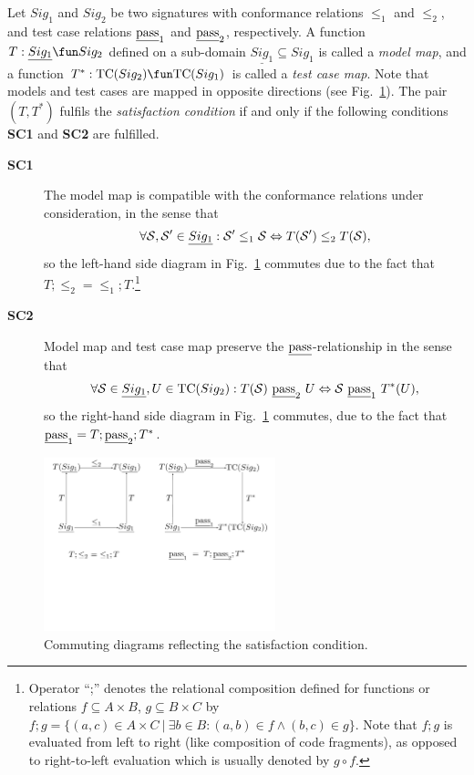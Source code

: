 Let $Sig_1$ and $Sig_2$ be two signatures with conformance relations $\le_1$ and $\le_2$,
and test case relations $\underline{\text{pass}}_1$ and $\underline{\text{pass}}_2$, respectively.
A function $T:\underline{Sig_1} \fun Sig_2$ defined on a sub-domain $\underline{Sig_1} \subseteq Sig_1$
 is called
a \emph{model map}, and a function $T^*:\tc(Sig_2) \fun \tc(Sig_1)$ is called a \emph{test case map}. Note that models and test cases are mapped in opposite directions
(see Fig.~\ref{fig:satisfaction-relation}).
The pair $(T,T^*)$ fulfils the \emph{satisfaction condition} if and only if the following conditions {\bf SC1} and {\bf SC2} are fulfilled.
\begin{description}
\item[\bf SC1] The model map is compatible with the conformance relations under consideration, in the sense that
$$
\forall {\cal S},{\cal S}'\in \underline{Sig_1}: {\cal S}' \le_1 {\cal S} \Leftrightarrow
T({\cal S}') \le_2 T({\cal S}),
$$
so   the left-hand side diagram   in Fig.~\ref{fig:satisfaction-relation} commutes due to the fact that
$T;\le_2 = \le_1;T$.\footnote{Operator ``;'' denotes the relational composition defined for
functions or relations $f\subseteq A\times B$, $g\subseteq B\times C$ by
$f;g = \{(a,c)\in A\times C~|~\exists b\in B: (a,b)\in f \wedge (b,c)\in g\}$.
Note that $f;g$ is evaluated from left to right (like composition of code fragments),
as opposed to right-to-left evaluation which is usually denoted by $g\circ f$.}

\item[\bf SC2] Model map and test case map preserve the $\underline{\text{pass}}$-relationship in the sense that
$$
\forall {\cal S}\in \underline{Sig_1}, U \in\tc(Sig_2): T({\cal S})\ \pass_2\ U \Leftrightarrow {\cal S}\ \pass_1\ T^*(U),
$$
so the right-hand side diagram   in Fig.~\ref{fig:satisfaction-relation} commutes, due to the fact that
$\underline{\text{pass}}_1 = T;\underline{\text{pass}}_2;T^*$.
\end{description}

\begin{figure}
\centering
\includegraphics[width=0.6\textwidth]{satisfaction-condition.pdf}
\vspace*{-20mm}
 \caption{Commuting diagrams reflecting the satisfaction condition.}
 \label{fig:satisfaction-relation}
 \end{figure}



